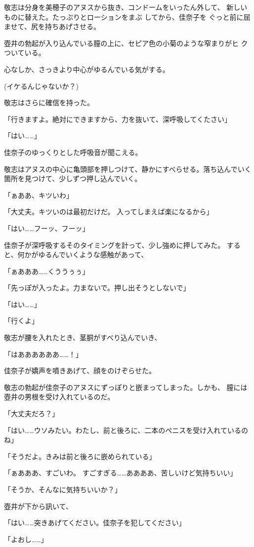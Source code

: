 ﻿\documentclass[
    book,tate,
    line_length=30zw,
    jafontsize=12pt,
    paper=b5j,
    landscape,
    ]{jlreq}
\begin{document}
敬志は分身を美穂子のアヌスから抜き、コンドームをいったん外して、
新しいものに替えた。たっぷりとローションをまぶ してから、佳奈子を
ぐっと前に屈ませて、尻を持ちあげさせる。

壺井の勃起が入り込んでいる膣の上に、セピア色の小菊のような窄まりがヒ
クついている。

心なしか、さっきより中心がゆるんでいる気がする。

(イケるんじゃないか？)

敬志はさらに確信を持った。

「行きますよ。絶対にできますから、力を抜いて、深呼吸してくたさい」

「はい……」

佳奈子のゆっくりとした呼吸音が聞こえる。

敬志はアヌスの中心に亀頭部を押しつけて、静かにすべらせる。落ち込んでいく
箇所を見つけて、少しずつ押し込んでいく。

「ぁああ、キツいわ」

「大丈夫。キツいのは最初だけだ。 入ってしまえば楽になるから」

「はい……フーッ、フーッ」

佳奈子が深呼吸するそのタイミングを計って、少し強めに押してみた。
すると、何かがゆるんでいくような感触があって、

「ぁあああ……くううぅぅ」

「先っぽが入ったよ。力まないで。押し出そうとしないで」

「はい……」

「行くよ」

敬志が腰を入れたとき、茎胴がすべり込んでいき、

「はああああああ……！」

佳奈子が嬌声を噴きあげて、顔をのけぞらせた。

敬志の勃起が佳奈子のアヌスにずっぽりと嵌まってしまった。しかも、
膣には壺井の男根を受け入れているのだ。

「大丈夫だろ？」

「はい……ウソみたい。わたし、前と後ろに、二本のペニスを受け入れているのね」

「そうだよ。きみは前と後ろに嵌められている」

「ぁあああ、すごいわ。 すごすぎる……ああああ、苦しいけど気持ちいい」

「そうか、そんなに気持ちいいか？」

壺井が下から訊いて、

「はい……突きあげてください。佳奈子を犯してください」

「よおし……」
\end{document}
